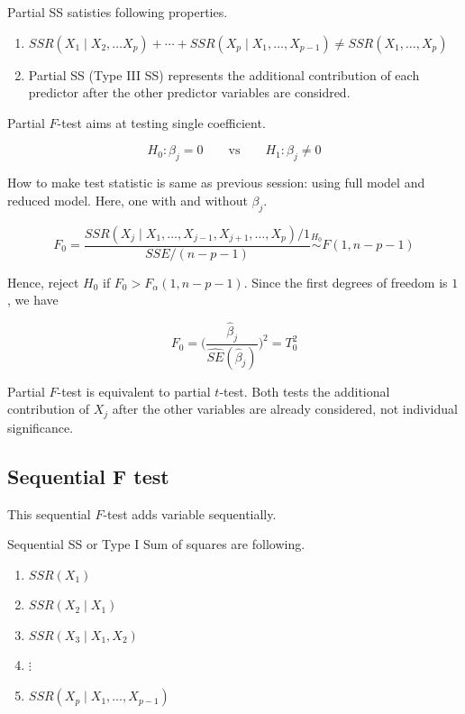 \documentclass[]{book}
\theoremstyle{definition}
\theoremstyle{definition}
\theoremstyle{definition}
\theoremstyle{remark}
\let\BeginKnitrBlock\begin \let\EndKnitrBlock\end
\begin{document}
\BeginKnitrBlock{remark}
{}Partial SS satisties following properties.

\begin{enumerate}
  \item $SSR(X_1 \mid X_2, \ldots X_p) + \cdots + SSR(X_p \mid X_1, \ldots, X_{p - 1}) \neq SSR(X_1, \ldots, X_p)$
  \item Partial SS (Type III SS) represents the additional contribution of each predictor after the other predictor variables are considred.
\end{enumerate}
\EndKnitrBlock{remark}

Partial \(F\)-test aims at testing single coefficient.

\[H_0: \beta_j = 0 \qquad \text{vs} \qquad H_1 : \beta_j \neq 0\]

How to make test statistic is same as previous session: using full model and reduced model. Here, one with and without \(\beta_j\).

\begin{equation}
  F_0 = \frac{SSR(X_j \mid X_1, \ldots, X_{j - 1}, X_{j + 1}, \ldots, X_p) / 1}{SSE / (n - p - 1)} \stackrel{H_0}{\sim}F(1, n - p - 1)
  \label{eq:partialstat}
\end{equation}

Hence, reject \(H_0\) if \(F_0 > F_{\alpha}(1, n - p - 1)\). Since the first degrees of freedom is \(1\), we have

\[F_0 = \bigg( \frac{\hat\beta_j}{\widehat{SE}(\hat\beta_j)} \bigg)^2 = T_0^2\]

\BeginKnitrBlock{remark}
{}Partial \(F\)-test is equivalent to partial \(t\)-test. Both tests the additional contribution of \(X_j\) after the other variables are already considered, not individual significance.
\EndKnitrBlock{remark}

\hypertarget{sequential-f-test}{%
\subsection{Sequential F test}\label{sequential-f-test}}

This sequential \(F\)-test adds variable sequentially.

\BeginKnitrBlock{definition}[Sequential sum of squares]
\protect\hypertarget{def:seqs}{}{\label{def:seqs} {} }Sequential SS or Type I Sum of squares are following.

\begin{enumerate}
  \item $SSR(X_1)$
  \item $SSR(X_2 \mid X_1)$
  \item $SSR(X_3 \mid X_1, X_2)$
  \item $\vdots$
  \item $SSR(X_p \mid X_1, \ldots, X_{p - 1})$
\end{enumerate}
\EndKnitrBlock{definition}
\end{document}
